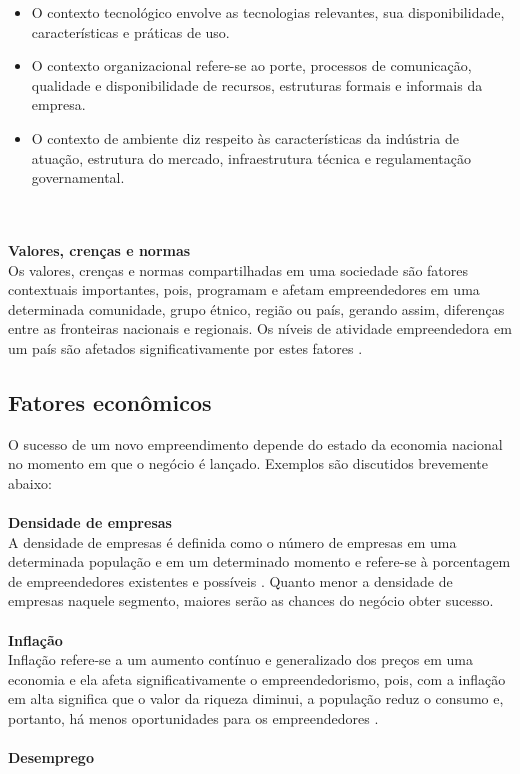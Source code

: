 \begin{itemize}
\item O contexto tecnológico envolve as tecnologias relevantes, sua disponibilidade, características e práticas de uso. 
\item O contexto organizacional refere-se ao porte, processos de comunicação, qualidade e disponibilidade de recursos, estruturas formais e informais da empresa. 
\item O contexto de ambiente diz respeito às características da indústria de atuação, estrutura do mercado, infraestrutura técnica e regulamentação governamental.
\end{itemize}
\\
\\
\textbf{Valores, crenças e normas}
\\

Os valores, crenças e normas compartilhadas em uma sociedade são fatores contextuais importantes, pois, programam e afetam empreendedores em uma determinada comunidade, grupo étnico, região ou país, gerando assim, diferenças entre as fronteiras nacionais e regionais. Os níveis de atividade empreendedora em um país são afetados significativamente por estes fatores \cite{ligthelma.a.&cantm.c2002}.

\subsection{Fatores econômicos}
\label{subsec:framing}

O sucesso de um novo empreendimento depende do estado da economia nacional no momento em que o negócio é lançado. Exemplos são discutidos brevemente abaixo:
\\
\\
\textbf{Densidade de empresas}
\\

A densidade de empresas é definida como o número de empresas em uma determinada população e em um determinado momento e refere-se à porcentagem de empreendedores existentes e possíveis \cite{thandekaruthkunene2008}. Quanto menor a densidade de empresas naquele segmento, maiores serão as chances do negócio obter sucesso.
\\
\\
\textbf{Inflação}
\\

Inflação refere-se a um aumento contínuo e generalizado dos preços em uma economia e ela afeta significativamente o empreendedorismo, pois, com a inflação em alta significa que o valor da riqueza diminui, a população reduz o consumo e, portanto, há menos oportunidades para os empreendedores \cite{vivierss.vaneedens.&venter2001}.
\\
\\
\textbf{Desemprego}
\\

